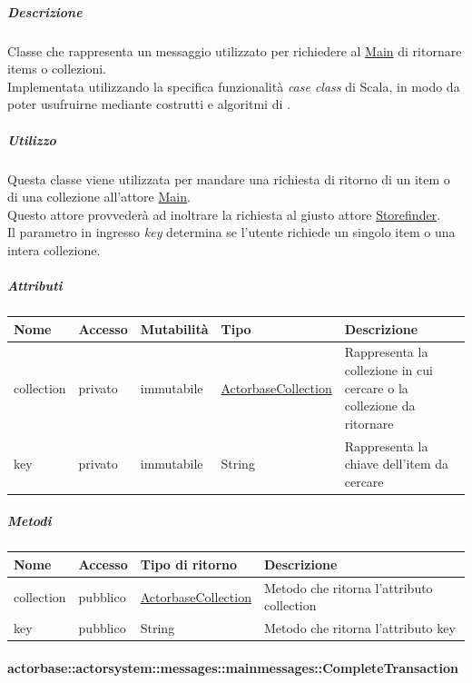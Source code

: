 \documentclass{scalatekids-article}
\begin{document}
\subparagraph{Descrizione}
Classe che rappresenta un messaggio utilizzato per richiedere al
\hyperref[sec:actorbase::actorsystem::actors::main::Main]{Main} di ritornare items o collezioni.\\Implementata utilizzando la specifica funzionalità \textit{case class} di Scala,
in modo da poter usufruirne mediante costrutti e algoritmi di
.

\subparagraph{Utilizzo}
Questa classe viene utilizzata per mandare una richiesta di ritorno di un item o di una collezione all'attore
\hyperref[sec:actorbase::actorsystem::actors::main::Main]{Main}.\\Questo attore
provvederà ad inoltrare la richiesta al giusto attore \hyperref[sec:actorbase::actorsystem::actors::storefinder::Storefinder]{Storefinder}.\\Il
parametro in ingresso \textit{key} determina se l'utente richiede un singolo
item o una intera collezione.

\subparagraph{Attributi}
\begin{tabular}{| p{2cm} | p{1.5cm} | p{2cm} | p{3cm} | p{8.5cm} |}
  \hline
  Nome & Accesso & Mutabilità & Tipo & Descrizione\\
  \hline
  collection & privato & immutabile & \hyperref[sec:actorbase::actorsystem::utils::ActorbaseCollection]{ActorbaseCollection} & Rappresenta la collezione in cui cercare o la collezione da ritornare \\
  \hline
  key & privato & immutabile & String & Rappresenta la chiave dell'item da cercare\\
  \hline
\end{tabular}

\subparagraph{Metodi}
\begin{tabular}{| l | l | l | l |}
  \hline
  Nome & Accesso & Tipo di ritorno & Descrizione\\
  \hline
  collection & pubblico & \hyperref[sec:actorbase::actorsystem::utils::ActorbaseCollection]{ActorbaseCollection} & Metodo che ritorna l'attributo collection\\
  \hline
  key & pubblico & String & Metodo che ritorna l'attributo key\\
  \hline
\end{tabular}

\paragraph{actorbase::actorsystem::messages::mainmessages::CompleteTransaction}
\label{sec:actorbase::actorsystem::messages::mainmessages::CompleteTransaction}
\end{document}

